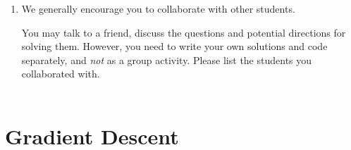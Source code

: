 \documentclass[11pt,english]{article}
\begin{document}
\begin{enumerate}
\item We generally encourage you to collaborate with other students.

You may talk to a friend,
discuss the questions and potential directions for solving them. However, you need to write
your own solutions and code separately, and \emph{not} as a group activity.
Please list the students you collaborated with. \\ \\

\end{enumerate}


\section{Gradient Descent}
\end{document}
